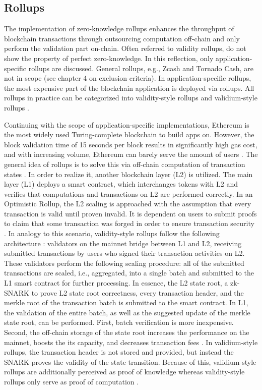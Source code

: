 \subsection{Rollups}
The implementation of zero-knowledge rollups enhances the throughput of blockchain transactions through outsourcing computation off-chain and only perform the validation part on-chain. Often referred to validity rollups, do not show the property of perfect zero-knowledge. In this reflection, only application-specific rollups are discussed. General rollups, e.g., Zcash and Tornado Cash, are not in scope (see chapter 4 on exclusion criteria). In application-specific rollups, the most expensive part of the blockchain application is deployed via rollups. All rollups in practice can be categorized into validity-style rollups and validium-style rollups \citep{chen2022review}.

Continuing with the scope of application-specific implementations, Ethereum is the most widely used Turing-complete blockchain to build apps on. However, the block validation time of 15 seconds per block results in significantly high gas cost, and with increasing volume, Ethereum can barely serve the amount of users \citep{scalingintro}. The general idea of rollups is to solve this via off-chain computation of transaction states \citep{chen2022review}. In order to realize it, another blockchain layer (L2) is utilized. The main layer (L1) deploys a smart contract, which interchanges tokens with L2 and verifies that computations and transactions on L2 are performed correctly. In an Optimistic Rollup, the L2 scaling is approached with the assumption that every transaction is valid until proven invalid. It is dependent on users to submit proofs to claim that some transaction was forged in order to ensure transaction security \citep{zksyncintro}. In analogy to this scenario, validity-style rollups follow the following architecture \citep{buterinrollups}: validators on the mainnet bridge between L1 and L2, receiving submitted transactions by users who signed their transaction activities on L2. These validators perform the following scaling procedure: all of the submitted transactions are scaled, i.e., aggregated, into a single batch and submitted to the L1 smart contract for further processing. In essence, the L2 state root, a zk-SNARK to prove L2 state root correctness, every transaction header, and the merkle root of the transaction batch is submitted to the smart contract. In L1, the validation of the entire batch, as well as the suggested update of the merkle state root, can be performed. First, batch verification is more inexpensive. Second, the off-chain storage of the state root increases the performance on the mainnet, boosts the its capacity, and decreases transaction fees \citep{chen2022review}. In validium-style rollups, the transaction header is not stored and provided, but instead the SNARK proves the validity of the state transition. Because of this, validium-style rollups are additionally perceived as proof of knowledge whereas validity-style rollups only serve as proof of computation \citep{validiumintro}. 

